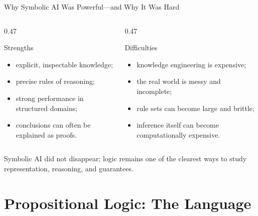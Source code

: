 \documentclass[aspectratio=169,10pt]{beamer}
\begin{document}
\begin{frame}[shrink=10]{Why Symbolic AI Was Powerful---and Why It Was Hard}
  \begin{columns}[T,onlytextwidth]
    \begin{column}{0.47\textwidth}
      \begin{block}{Strengths}
        \begin{itemize}
          \item explicit, inspectable knowledge;
          \item precise rules of reasoning;
          \item strong performance in structured domains;
          \item conclusions can often be explained as proofs.
        \end{itemize}
      \end{block}
    \end{column}
    \begin{column}{0.47\textwidth}
      \begin{block}{Difficulties}
        \begin{itemize}
          \item knowledge engineering is expensive;
          \item the real world is messy and incomplete;
          \item rule sets can become large and brittle;
          \item inference itself can become computationally expensive.
        \end{itemize}
      \end{block}
    \end{column}
  \end{columns}

  \begin{keyidea}
    Symbolic AI did not disappear; logic remains one of the clearest ways to study representation, reasoning, and guarantees.
  \end{keyidea}
\end{frame}

\section{Propositional Logic: The Language}
\end{document}
